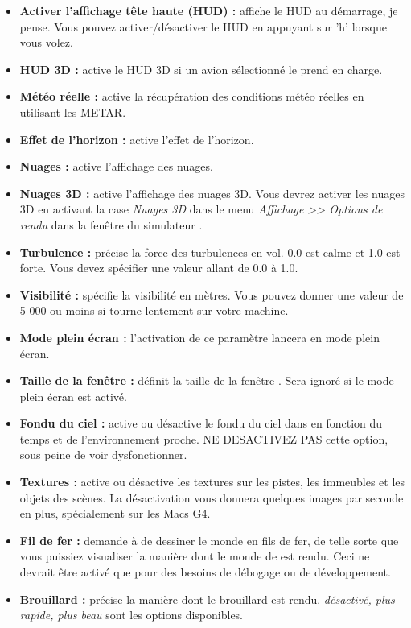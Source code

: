 {{\begin{itemize}
\item \textbf{Activer l'affichage t\^{e}te haute (HUD) :} affiche le HUD au d\'{e}marrage, je pense. Vous pouvez activer/d\'{e}sactiver le HUD en appuyant sur 'h' lorsque vous volez.
\item \textbf{HUD 3D :} active le HUD 3D si un avion s\'{e}lectionn\'{e} le prend en charge.
\item \textbf{M\'{e}t\'{e}o r\'{e}elle :} active la r\'{e}cup\'{e}ration des conditions m\'{e}t\'{e}o r\'{e}elles en utilisant les METAR.
\item \textbf{Effet de l'horizon :} active l'effet de l'horizon.
\item \textbf{Nuages :} active l'affichage des nuages.
\item \textbf{Nuages 3D :} active l'affichage des nuages 3D. Vous devrez activer les nuages 3D en activant la case \textit{Nuages 3D} dans le menu \textit{Affichage >> Options de rendu} dans la fen\^{e}tre du simulateur \FlightGear{}. 
\item \textbf{Turbulence :} pr\'{e}cise la force des turbulences en vol. 0.0 est calme et 1.0 est forte. Vous devez sp\'{e}cifier une valeur allant de 0.0 \`{a} 1.0.
\item \textbf{Visibilit\'{e} :} sp\'{e}cifie la visibilit\'{e} en m\`{e}tres. Vous pouvez donner une valeur de 5 000 ou moins si \FlightGear{} tourne lentement sur votre machine.
\item \textbf{Mode plein \'{e}cran :} l'activation de ce param\`{e}tre lancera \FlightGear{} en mode plein \'{e}cran.
\item \textbf{Taille de la fen\^{e}tre :} d\'{e}finit la taille de la fen\^{e}tre \FlightGear{}. Sera ignor\'{e} si le mode plein \'{e}cran est activ\'{e}.
\item \textbf{Fondu du ciel :} active ou d\'{e}sactive le fondu du ciel dans \FlightGear{} en fonction du temps et de l'environnement proche. NE DESACTIVEZ PAS cette option, sous peine de voir \FlightGear{} dysfonctionner.
\item \textbf{Textures :} active ou d\'{e}sactive les textures sur les pistes, les immeubles et les objets des sc\`{e}nes. La d\'{e}sactivation vous donnera quelques images par seconde en plus, sp\'{e}cialement sur les Macs G4.
\item \textbf{Fil de fer :} demande \`{a} \FlightGear{} de dessiner le monde en fils de fer, de telle sorte que vous puissiez visualiser la mani\`{e}re dont le monde de \FlightGear{} est rendu. Ceci ne devrait \^{e}tre activ\'{e} que pour des besoins de d\'{e}bogage ou de d\'{e}veloppement.
\item \textbf{Brouillard :} pr\'{e}cise la mani\`{e}re dont le brouillard est rendu. \textit{d\'{e}sactiv\'{e}, plus rapide, plus beau} sont les options disponibles.
\end{itemize}
}{}

}
